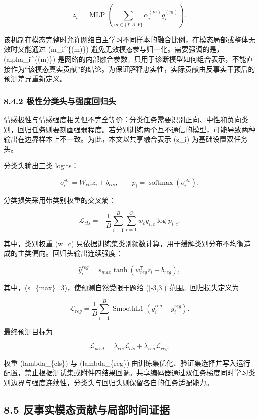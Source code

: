 \documentclass[
  12pt,
  a4paper,
]{ctexart}
\begin{document}
\[
z_i=\operatorname{MLP}\left(\sum_{m\in\{T,A,V\}}\alpha_i^{(m)}g_i^{(m)}\right).
\]

该机制在模态完整时允许网络自主学习不同样本的融合比例，在模态局部或整体无效时又能通过
(m\_i\^{}\{(m)\})
避免无效模态参与归一化。需要强调的是，(alpha\_i\^{}\{(m)\})
是网络的内部融合参数，只用于诊断模型如何组合表示，不能直接作为``该模态真实贡献''的结论。为保证解释忠实性，实际贡献由反事实干预后的预测差异重新定义。

\hypertarget{ux6781ux6027ux5206ux7c7bux5934ux4e0eux5f3aux5ea6ux56deux5f52ux5934}{%
\subsubsection{8.4.2
极性分类头与强度回归头}\label{ux6781ux6027ux5206ux7c7bux5934ux4e0eux5f3aux5ea6ux56deux5f52ux5934}}

情感极性与情感强度相关但不完全等价：分类任务需要识别正向、中性和负向类别，回归任务则要刻画强弱程度。若分别训练两个互不通信的模型，可能导致两种输出在边界样本上不一致。为此，本文以共享融合表示
(z\_i) 为基础设置双任务头。

分类头输出三类 logits：

\[
o_i^{cls}=W_{cls}z_i+b_{cls},
\qquad
p_i=\operatorname{softmax}(o_i^{cls}).
\]

分类损失采用带类别权重的交叉熵：

\[
\mathcal L_{cls}=-\frac1B\sum_{i=1}^{B}
\sum_{c=1}^{C}w_c y_{i,c}\log p_{i,c}.
\]

其中，类别权重 (w\_c)
只依据训练集类别频数计算，用于缓解类别分布不均衡造成的主类偏向。回归头输出连续强度：

\[
\widehat y_i^{reg}=s_{max}\tanh(w_{reg}^{\mathsf T}z_i+b_{reg}),
\]

其中，(s\_\{max\}=3)，使预测自然受限于题给 ({[}-3,3{]})
范围。回归损失定义为

\[
\mathcal L_{reg}=\frac1B\sum_{i=1}^{B}
\operatorname{SmoothL1}(\widehat y_i^{reg}-y_i^{reg}).
\]

最终预测目标为

\[
\mathcal L_{pred}=\lambda_{cls}\mathcal L_{cls}
 +\lambda_{reg}\mathcal L_{reg}.
\]

权重 (lambda\_\{cls\}) 与 (lambda\_\{reg\})
由训练集优化、验证集选择并写入运行配置，禁止根据测试集或附件四结果回调。共享编码器通过双任务梯度同时学习类别边界与强度连续性，分类头与回归头则保留各自的任务适配能力。

\hypertarget{ux53cdux4e8bux5b9eux6a21ux6001ux8d21ux732eux4e0eux5c40ux90e8ux65f6ux95f4ux8bc1ux636e}{%
\subsection{8.5
反事实模态贡献与局部时间证据}\label{ux53cdux4e8bux5b9eux6a21ux6001ux8d21ux732eux4e0eux5c40ux90e8ux65f6ux95f4ux8bc1ux636e}}
\end{document}
